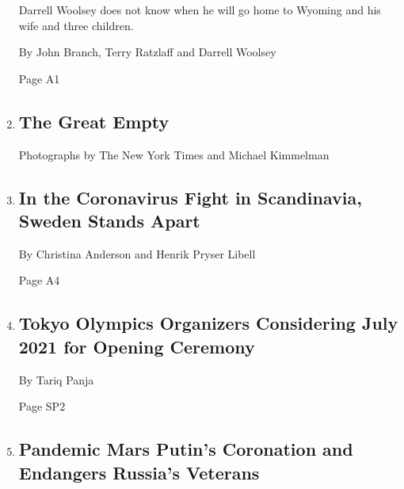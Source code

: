\begin{enumerate}
  Darrell Woolsey does not know when he will go home to Wyoming and his
  wife and three children.

  By John Branch, Terry Ratzlaff and Darrell Woolsey

  Page A1
\item
  \href{/interactive/2020/03/23/world/coronavirus-great-empty.html}{}

  \hypertarget{the-great-empty}{%
  \subsection{The Great Empty}\label{the-great-empty}}

  Photographs by The New York Times and Michael Kimmelman
\item
  \href{/2020/03/28/world/europe/sweden-coronavirus.html}{}

  \hypertarget{in-the-coronavirus-fight-in-scandinavia-sweden-stands-apart}{%
  \subsection{In the Coronavirus Fight in Scandinavia, Sweden Stands
  Apart}\label{in-the-coronavirus-fight-in-scandinavia-sweden-stands-apart}}

  By Christina Anderson and Henrik Pryser Libell

  Page A4
\item
  \href{/2020/03/28/sports/olympics/coronavirus-olympics-postponed-2021.html}{}

  \hypertarget{tokyo-olympics-organizers-considering-july-2021-for-opening-ceremony}{%
  \subsection{Tokyo Olympics Organizers Considering July 2021 for
  Opening
  Ceremony}\label{tokyo-olympics-organizers-considering-july-2021-for-opening-ceremony}}

  By Tariq Panja

  Page SP2
\item
  \href{/2020/03/28/world/europe/russia-coronavirus-putin-wwii.html}{}

  \hypertarget{pandemic-mars-putins-coronation-and-endangers-russias-veterans}{%
  \subsection{Pandemic Mars Putin's Coronation and Endangers Russia's
  Veterans}\label{pandemic-mars-putins-coronation-and-endangers-russias-veterans}}


\end{enumerate}

